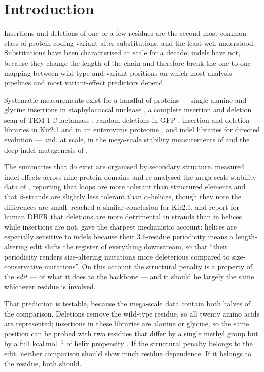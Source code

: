 \documentclass[11pt]{article}
\begin{document}
\section{Introduction}

Insertions and deletions of one or a few residues are the second most common class of
protein-coding variant after substitutions, and the least well understood. Substitutions have
been characterised at scale for a decade; indels have not, because they change the length of the
chain and therefore break the one-to-one mapping between wild-type and variant positions on which
most analysis pipelines and most variant-effect predictors depend.

Systematic measurements exist for a handful of proteins --- single alanine and glycine insertions
in staphylococcal nuclease \citep{sondek1990,sondek1992}, a complete insertion and deletion scan
of TEM-1 $\beta$-lactamase \citep{gonzalez2019}, random deletions in GFP \citep{arpino2014},
insertion and deletion libraries in Kir2.1 \citep{macdonald2023} and in an enterovirus proteome
\citep{bakhache2025}, and indel libraries for directed evolution \citep{emond2020,hallet1997} ---
and, at scale, in the mega-scale stability measurements of \citet{tsuboyama2023} and the deep
indel mutagenesis of \citet{topolska2025}.

The summaries that do exist are organised by secondary structure. \citet{topolska2025} measured
indel effects across nine protein domains and re-analysed the mega-scale stability data of
\citet{tsuboyama2023}, reporting that loops are more tolerant than structured elements and that
$\beta$-strands are slightly less tolerant than $\alpha$-helices, though they note the differences
are small. \citet{macdonald2023} reached a similar conclusion for Kir2.1, and
\citet{larsenledet2025} report for human DHFR that deletions are more detrimental in strands than
in helices while insertions are not. \citet{goldman2025} gave the
sharpest mechanistic account: helices are especially sensitive to indels because their
$3.6$-residue periodicity means a length-altering edit shifts the register of everything
downstream, so that ``their periodicity renders size-altering mutations more deleterious compared
to size-conservative mutations''. On this account the structural penalty is a property of the
\emph{edit} --- of what it does to the backbone --- and it should be largely the same whichever
residue is involved.

That prediction is testable, because the mega-scale data contain both halves of the comparison.
Deletions remove the wild-type residue, so all twenty amino acids are represented; insertions in
these libraries are alanine or glycine, so the same position can be probed with two residues that
differ by a single methyl group but by a full kcal\,mol$^{-1}$ of helix propensity
\citep{pace1998}. If the structural penalty belongs to the edit, neither comparison should show
much residue dependence. If it belongs to the residue, both should.
\end{document}
